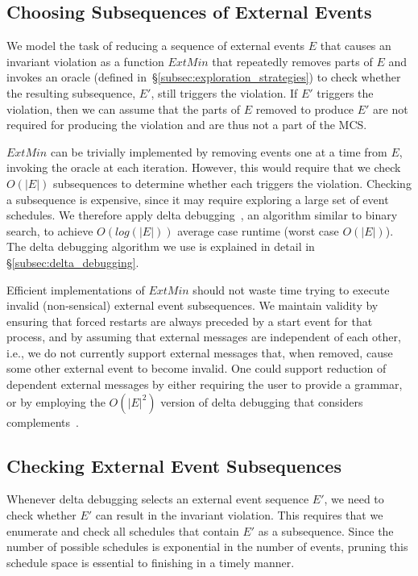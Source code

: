 \subsection{Choosing Subsequences of External Events}

We model the task of reducing a sequence of external events $E$ that causes an invariant violation
as a function $ExtMin$ that repeatedly removes parts of $E$ and invokes an
oracle (defined in~\S\ref{subsec:exploration_strategies})
to check whether the resulting subsequence, $E'$, still triggers the violation. If $E'$ triggers the
violation, then we can assume that the parts of $E$ removed to produce $E'$ are not required
for producing the violation and are thus not a part of the MCS.

$ExtMin$ can be trivially implemented by removing events one at a time
from $E$, invoking the oracle at each iteration. However, this would require that we check
$O(|E|)$ subsequences to determine whether each triggers the violation.
Checking a subsequence
is expensive, since it may require exploring a large set of event schedules.
We therefore apply
delta debugging~\cite{Zeller:1999:YMP:318773.318946,Zeller:2002:SIF:506201.506206}, an algorithm similar to
binary search, to achieve $O(log(|E|))$ average case runtime (worst case
$O(|E|)$). The delta debugging algorithm we use is explained in detail in
\S\ref{subsec:delta_debugging}.

Efficient implementations of $ExtMin$ should not waste time trying to execute invalid
(non-sensical) external event subsequences. We maintain validity by
ensuring that forced restarts are always preceded by a start
event for that process, and by assuming that external
messages are independent of each other, i.e., we do not currently support external messages that, when removed, cause some
other external event to become invalid. One could support reduction of
dependent external messages by either requiring the user to provide a grammar,
or by employing the $O(|E|^2)$ version of delta debugging that considers
complements~\cite{Zeller:2002:SIF:506201.506206}.

\subsection{Checking External Event Subsequences}

Whenever delta debugging selects an external event sequence $E'$, we need to check
whether $E'$ can result in the invariant violation. This requires that we enumerate
and check all schedules that contain $E'$ as a subsequence.
Since the number of possible schedules is exponential in the number of events,
pruning this schedule space is essential to finishing in a timely manner.

